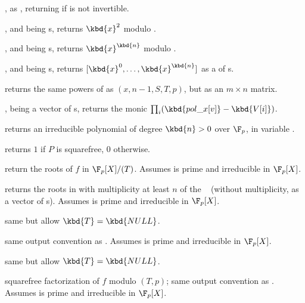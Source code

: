  , as ,
returning  if  is not invertible.

,  and
 being s, returns $\kbd{x}^2$ modulo .

,  and
 being s, returns $\kbd{x}^\kbd{n}$ modulo .

,  and
 being s, returns $[\kbd{x}^0, \dots, \kbd{x}^\kbd{n}]$ as a
 of s.

returns the same powers of  as $(x, n-1,S, T, p)$,
but as an $m\times n$ matrix.

,
 being a vector of s, returns the monic 
$\prod_i (\kbd{pol\_x[v]} - \kbd{V[i]})$.


 returns an irreducible polynomial
of degree $\kbd{n} > 0$ over $\F_p$, in variable .

 returns $1$ if $P$ is
squarefree, $0$ otherwise.


 return the roots of $f$ in
$\F_p[X]/(T)$. Assumes  is prime and  irreducible in $\F_p[X]$.

returns the roots in  with multiplicity at least $n$ of
the ~ (without multiplicity, as a vector of s).
Assumes  is prime and  irreducible in $\F_p[X]$.

 same but allow $\kbd{T} = \kbd{NULL}$.

 same output convention as
. Assumes  is prime and  irreducible
in $\F_p[X]$.

 same but allow $\kbd{T} = \kbd{NULL}$.

 squarefree
factorization of $f$ modulo $(T,p)$; same output convention as
. Assumes  is prime and 
irreducible in $\F_p[X]$.

